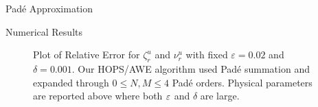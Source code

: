 \begin{section}{Pad\'e Approximation}
\begin{section}{Numerical Results}
\vspace{-18mm}
\begin{figure}[H]
\centering
\vspace{3mm}
\caption{Plot of Relative Error for $\zeta^u_r$ and $\nu^u_r$ with fixed $\varepsilon = 0.02$ and $\delta = 0.001$. Our HOPS/AWE algorithm used Padé summation and expanded through $0 \leq N,M \leq 4$ Padé orders. Physical parameters are reported above where both $\varepsilon$ and $\delta$ are large.}
\end{figure}


\end{section}
\end{section}
